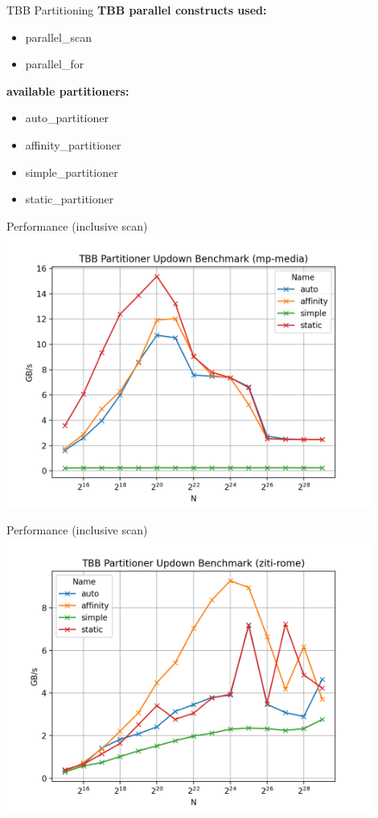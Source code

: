 \begin{frame}{TBB Partitioning} 
	\textbf{TBB parallel constructs used:}
	\begin{itemize}
		\item parallel\_scan
		\item parallel\_for
	\end{itemize}
	\vspace{.2in}
	\textbf{available partitioners:}
	\begin{itemize}
		\item auto\_partitioner
		\item affinity\_partitioner
		\item simple\_partitioner
		\item static\_partitioner
	\end{itemize}
\end{frame} 

\begin{frame}{Performance (inclusive scan)}
	\centering
	\vspace{-5pt}
	\includegraphics[width=0.90\textwidth]{"wiki/TBB Partitioner Updown Benchmark (mp-media).png"}
\end{frame}

\begin{frame}{Performance (inclusive scan)}
	\centering
	\vspace{-5pt}
	\includegraphics[width=0.90\textwidth]{"wiki/TBB Partitioner Updown Benchmark (ziti-rome).png"}
\end{frame}
